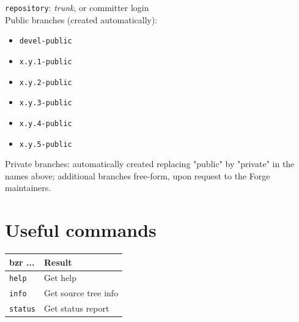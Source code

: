 \documentclass[tumble,foldmark,a4paper]{leaflet}
\begin{document}
\texttt{repository}: \textit{trunk}, or committer login \\

Public branches (created automatically):
\begin{center}
\begin{itemize}
 \item \texttt{devel-public}
 \item \texttt{x.y.1-public}
 \item \texttt{x.y.2-public}
 \item \texttt{x.y.3-public}
 \item \texttt{x.y.4-public}
 \item \texttt{x.y.5-public}
\end{itemize}
\end{center}

Private branches: automatically created replacing "public" by "private"
in the names above; additional branches free-form, upon request to the
Forge maintainers. \\

\newpage

\section*{Useful commands}

\begin{center}
 \begin{tabular}{l l}
  \textbf{bzr ...} & \textbf{Result} \\
  \hline
  \texttt{help} & Get help \\
  \texttt{info} & Get source tree info \\
  \texttt{status} & Get status report \\
 \end{tabular}
\end{center}

\begin{center}
\end{center}
\end{document}
